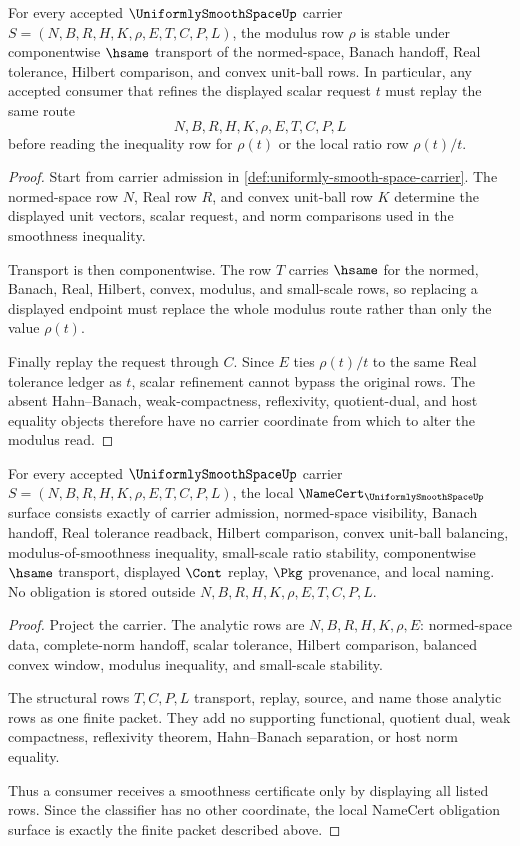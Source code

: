 \begin{theorem}
\label{thm:uniformly-smooth-space-modulus-stability}
For every accepted $\UniformlySmoothSpaceUp$ carrier $S=(N,B,R,H,K,\rho,E,T,C,P,L)$, the modulus row $\rho$ is stable under componentwise $\hsame$ transport of the normed-space, Banach handoff, Real tolerance, Hilbert comparison, and convex unit-ball rows. In particular, any accepted consumer that refines the displayed scalar request $t$ must replay the same route
$$
N,B,R,H,K,\rho,E,T,C,P,L
$$
before reading the inequality row for $\rho(t)$ or the local ratio row $\rho(t)/t$.
\end{theorem}
\begin{proof}
Start from carrier admission in \autoref{def:uniformly-smooth-space-carrier}. The normed-space row $N$, Real row $R$, and convex unit-ball row $K$ determine the displayed unit vectors, scalar request, and norm comparisons used in the smoothness inequality.

Transport is then componentwise. The row $T$ carries $\hsame$ for the normed, Banach, Real, Hilbert, convex, modulus, and small-scale rows, so replacing a displayed endpoint must replace the whole modulus route rather than only the value $\rho(t)$.

Finally replay the request through $C$. Since $E$ ties $\rho(t)/t$ to the same Real tolerance ledger as $t$, scalar refinement cannot bypass the original rows. The absent Hahn--Banach, weak-compactness, reflexivity, quotient-dual, and host equality objects therefore have no carrier coordinate from which to alter the modulus read.
\end{proof}

\begin{theorem}
\label{thm:uniformly-smooth-space-namecert-obligation}
For every accepted $\UniformlySmoothSpaceUp$ carrier $S=(N,B,R,H,K,\rho,E,T,C,P,L)$, the local $\NameCert_{\UniformlySmoothSpaceUp}$ surface consists exactly of carrier admission, normed-space visibility, Banach handoff, Real tolerance readback, Hilbert comparison, convex unit-ball balancing, modulus-of-smoothness inequality, small-scale ratio stability, componentwise $\hsame$ transport, displayed $\Cont$ replay, $\Pkg$ provenance, and local naming. No obligation is stored outside $N,B,R,H,K,\rho,E,T,C,P,L$.
\end{theorem}
\begin{proof}
Project the carrier. The analytic rows are $N,B,R,H,K,\rho,E$: normed-space data, complete-norm handoff, scalar tolerance, Hilbert comparison, balanced convex window, modulus inequality, and small-scale stability.

The structural rows $T,C,P,L$ transport, replay, source, and name those analytic rows as one finite packet. They add no supporting functional, quotient dual, weak compactness, reflexivity theorem, Hahn--Banach separation, or host norm equality.

Thus a consumer receives a smoothness certificate only by displaying all listed rows. Since the classifier has no other coordinate, the local NameCert obligation surface is exactly the finite packet described above.
\end{proof}

